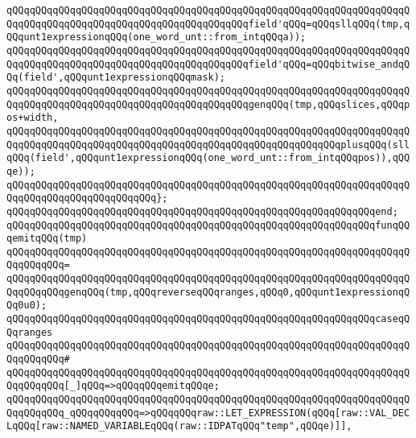 \newline
\verb|qQQqqQQqqQQqqQQqqQQqqQQqqQQqqQQqqQQqqQQqqQQqqQQqqQQqqQQqqQQqqQQqqQQqqQQqqQQqqQQqqQQqqQQqqQQqqQQqqQQqqQQqqQQqqQQqfield'qQQq=qQQqsllqQQq(tmp,qQQqunt1expressionqQQq(one_word_unt::from_intqQQqa));|\newline
\verb|qQQqqQQqqQQqqQQqqQQqqQQqqQQqqQQqqQQqqQQqqQQqqQQqqQQqqQQqqQQqqQQqqQQqqQQqqQQqqQQqqQQqqQQqqQQqqQQqqQQqqQQqqQQqqQQqfield'qQQq=qQQqbitwise_andqQQq(field',qQQqunt1expressionqQQqmask);|\newline
\newline
\verb|qQQqqQQqqQQqqQQqqQQqqQQqqQQqqQQqqQQqqQQqqQQqqQQqqQQqqQQqqQQqqQQqqQQqqQQqqQQqqQQqqQQqqQQqqQQqqQQqqQQqqQQqqQQqqQQqgenqQQq(tmp,qQQqslices,qQQqpos+width,|\newline
\verb|qQQqqQQqqQQqqQQqqQQqqQQqqQQqqQQqqQQqqQQqqQQqqQQqqQQqqQQqqQQqqQQqqQQqqQQqqQQqqQQqqQQqqQQqqQQqqQQqqQQqqQQqqQQqqQQqqQQqqQQqqQQqqQQqplusqQQq(sllqQQq(field',qQQqunt1expressionqQQq(one_word_unt::from_intqQQqpos)),qQQqe));|\newline
\verb|qQQqqQQqqQQqqQQqqQQqqQQqqQQqqQQqqQQqqQQqqQQqqQQqqQQqqQQqqQQqqQQqqQQqqQQqqQQqqQQqqQQqqQQqqQQqqQQq};|\newline
\verb|qQQqqQQqqQQqqQQqqQQqqQQqqQQqqQQqqQQqqQQqqQQqqQQqqQQqqQQqqQQqqQQqend;|\newline
\newline
\verb|qQQqqQQqqQQqqQQqqQQqqQQqqQQqqQQqqQQqqQQqqQQqqQQqqQQqqQQqqQQqqQQqfunqQQqemitqQQq(tmp)|\newline
\verb|qQQqqQQqqQQqqQQqqQQqqQQqqQQqqQQqqQQqqQQqqQQqqQQqqQQqqQQqqQQqqQQqqQQqqQQqqQQqqQQq=|\newline
\verb|qQQqqQQqqQQqqQQqqQQqqQQqqQQqqQQqqQQqqQQqqQQqqQQqqQQqqQQqqQQqqQQqqQQqqQQqqQQqqQQqgenqQQq(tmp,qQQqreverseqQQqranges,qQQq0,qQQqunt1expressionqQQq0u0);|\newline
\newline
\verb|qQQqqQQqqQQqqQQqqQQqqQQqqQQqqQQqqQQqqQQqqQQqqQQqqQQqqQQqqQQqqQQqcaseqQQqranges|\newline
\verb|qQQqqQQqqQQqqQQqqQQqqQQqqQQqqQQqqQQqqQQqqQQqqQQqqQQqqQQqqQQqqQQqqQQqqQQqqQQqqQQq#|\newline
\verb|qQQqqQQqqQQqqQQqqQQqqQQqqQQqqQQqqQQqqQQqqQQqqQQqqQQqqQQqqQQqqQQqqQQqqQQqqQQqqQQq[_]qQQq=>qQQqqQQqemitqQQqe;|\newline
\verb|qQQqqQQqqQQqqQQqqQQqqQQqqQQqqQQqqQQqqQQqqQQqqQQqqQQqqQQqqQQqqQQqqQQqqQQqqQQqqQQq_qQQqqQQqqQQq=>qQQqqQQqraw::LET_EXPRESSION(qQQq[raw::VAL_DECLqQQq[raw::NAMED_VARIABLEqQQq(raw::IDPATqQQq"temp",qQQqe)]],|\newline
